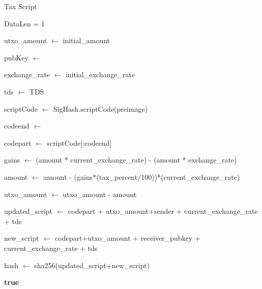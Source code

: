 \documentclass[a4paper,10pt,twocolumn]{extarticle}
\begin{document}
\begin{algorithm}[H]
\scriptsize
\DontPrintSemicolon
{} %
\caption{Tax Script}

	DataLen = 1\;
	
	utxo\_amount $\gets$ initial\_amount\;
	
	pubKey $\gets$ \;
	
	exchange\_rate $\gets$ initial\_exchange\_rate\;
	
	tds $\gets$ TDS \;

		{

			{

			scriptCode $\gets$ SigHash.scriptCode(preimage)\;

			codeend $\gets$ \;

			codepart $\gets$ scriptCode[:codeend]\;

			gains $\gets$ (amount * current\_exchange\_rate) - (amount * exchange\_rate)\;

				{

					amount $\gets$ amount - (gains*(tax\_percent/100))*(current\_exchange\_rate)\;

						{

						utxo\_amount $\gets$ utxo\_amount - amount\; 
						} 
				}
					
			updated\_script $\gets$ codepart + utxo\_amount+sender + current\_exchange\_rate + tds\;				 

			new\_script $\gets$ codepart+utxo\_amount + receiver\_pubkey + current\_exchange\_rate + tds\;
   
			hash $\gets$ sha256(updated\_script+new\_script)\;    
  
				{  
				\textbf{true}\; 
}
}
}
\end{algorithm}
\end{document}

